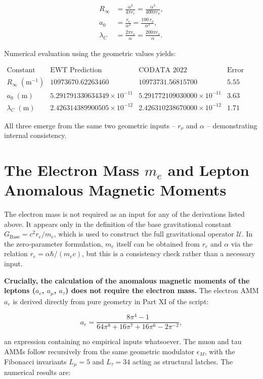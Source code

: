 \documentclass{article}
\begin{document}
	\begin{align}
		R_\infty &= \frac{\alpha^3}{4\pi r_e} = \frac{\alpha^3}{400\pi r_\nu},\\[2mm]
		a_0     &= \frac{r_e}{\alpha^2} = \frac{100\,r_\nu}{\alpha^2},\\[2mm]
		\lambda_C &= \frac{2\pi r_e}{\alpha} = \frac{200\pi r_\nu}{\alpha}.
	\end{align}
	
	Numerical evaluation using the geometric values yields:
	
	\[
	\begin{array}{lccc}
		\text{Constant} & \text{EWT Prediction} & \text{CODATA 2022} & \text{Error (ppm)}\\\hline
		R_\infty\;(\text{m}^{-1}) & 10973670.62263460 & 10973731.56815700 & 5.55\\
		a_0\;(\text{m}) & 5.291791330634349\times10^{-11} & 5.291772109030000\times10^{-11} & 3.63\\
		\lambda_C\;(\text{m}) & 2.426314389900505\times10^{-12} & 2.426310238670000\times10^{-12} & 1.71
	\end{array}
	\]
	
	All three emerge from the same two geometric inputs – $r_\nu$ and $\alpha$ – demonstrating internal consistency.
	
	\section{The Electron Mass $m_e$ and Lepton Anomalous Magnetic Moments}
	The electron mass is not required as an input for any of the derivations listed above. It appears only in the definition of the base gravitational constant $G_{\text{Base}} = c^2 r_e/m_e$, which is used to construct the full gravitational operator $\mathcal{U}$. In the zero‑parameter formulation, $m_e$ itself can be obtained from $r_e$ and $\alpha$ via the relation $r_e = \alpha\hbar/(m_e c)$, but this is a consistency check rather than a necessary input.
	
	\textbf{Crucially, the calculation of the anomalous magnetic moments of the leptons ($a_e$, $a_\mu$, $a_\tau$) does not require the electron mass.} The electron AMM $a_e$ is derived directly from pure geometry in Part XI of the script:
	
	\begin{equation}
		a_e = \frac{8\pi^4 - 1}{64\pi^8 + 16\pi^7 + 16\pi^6 - 2\pi^{-2}},
	\end{equation}
	
	an expression containing no empirical inputs whatsoever. The muon and tau AMMs follow recursively from the same geometric modulator $\epsilon_M$, with the Fibonacci invariants $L_\mu = 5$ and $L_\tau = 34$ acting as structural latches. The numerical results are:
	
\end{document}
